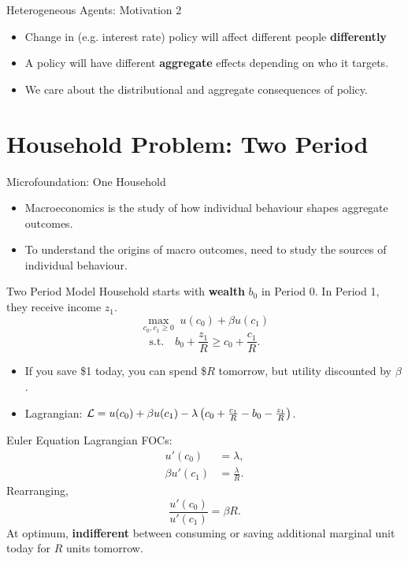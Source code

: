 \documentclass[10pt,aspectratio=169]{beamer}
\begin{document}
\begin{frame}{Heterogeneous Agents: Motivation 2}
\begin{itemize}
  \item Change in (e.g. interest rate) policy will affect different people \textbf{differently}
  \item A policy will have different \textbf{aggregate} effects depending on who it targets.
  \item We care about the distributional and aggregate consequences of policy.
\end{itemize}

\end{frame}

\section{Household Problem: Two Period}

\begin{frame}{Microfoundation: One Household}
  \begin{itemize}
    \item Macroeconomics is the study of how individual behaviour shapes aggregate outcomes.
    \item To understand the origins of macro outcomes, need to study the sources of individual behaviour.
  \end{itemize}
\end{frame}

\begin{frame}{Two Period Model}
  Household starts with \textbf{wealth} $b_0$ in Period 0. In Period 1, they receive income $z_1$.
  \[
    \max_{c_0, c_1 \ge 0} \; u(c_0) + \beta u(c_1)
  \]
  \[
    \text{s.t.}\quad b_0 + \frac{z_1}{R} \geq c_0 + \frac{c_1}{R}.
  \]
  \begin{itemize}
    \item If you save \$1 today, you can spend \$$R$ tomorrow, but utility discounted by $\beta$.
    \item Lagrangian: $\mathcal{L} = u(c_0) + \beta u(c_1) - \lambda\left( c_0 + \frac{c_1}{R} - b_0 - \frac{z_1}{R} \right)$.
  \end{itemize}
\end{frame}

\begin{frame}{Euler Equation}
  Lagrangian FOCs:
  \begin{align*}
    u'(c_0) &= \lambda, \\
    \beta u'(c_1) &= \frac{\lambda}{R}.
  \end{align*}
  Rearranging,
  \[
    \boxed{\frac{u'(c_0)}{u'(c_1)} = \beta R.}
  \]
  At optimum, \textbf{indifferent} between consuming or saving additional marginal unit today for $R$ units tomorrow.
\end{frame}
\end{document}
